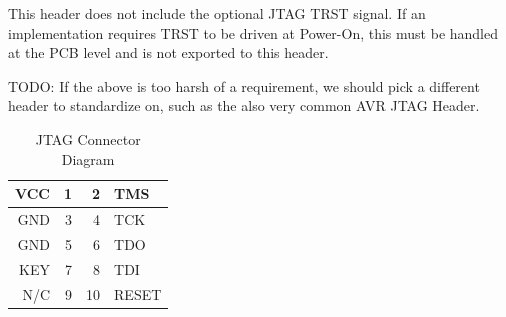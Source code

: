 \documentclass{article}
\begin{document}
This header does not include the optional JTAG TRST signal. If an implementation
requires TRST to be driven at Power-On, this must be handled at the
PCB level and is not exported to this header.

TODO: If the above is too harsh of a requirement, we should pick a different header to
standardize on, such as the also very common AVR JTAG Header.

\begin{table}[htp]
    \centering
    \caption{JTAG Connector Diagram}
    \label{tab:header}
    \begin{tabulary}{\textwidth}{|r|r|r|l|}
        \hline
        VCC & 1 & 2 & TMS \\
        \hline
        GND & 3 & 4 & TCK \\
        \hline
        GND & 5 & 6 & TDO \\
        \hline
        KEY & 7 & 8 & TDI \\
        \hline
        N/C & 9 & 10 & RESET \\
        \hline
    \end{tabulary}
\end{table}
\end{document}
